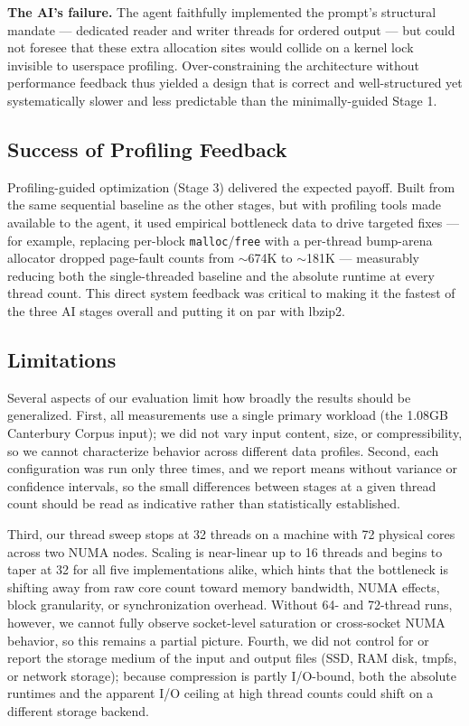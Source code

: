 \documentclass[conference]{IEEEtran}
\begin{document}
\textbf{The AI's failure.} The agent faithfully implemented the prompt's structural mandate --- dedicated reader and writer threads for ordered output --- but could not foresee that these extra allocation sites would collide on a kernel lock invisible to userspace profiling. Over-constraining the architecture without performance feedback thus yielded a design that is correct and well-structured yet systematically slower and less predictable than the minimally-guided Stage 1.

\subsection{Success of Profiling Feedback}
Profiling-guided optimization (Stage 3) delivered the expected payoff. Built from the same sequential baseline as the other stages, but with profiling tools made available to the agent, it used empirical bottleneck data to drive targeted fixes --- for example, replacing per-block \texttt{malloc}/\texttt{free} with a per-thread bump-arena allocator dropped page-fault counts from $\sim$674K to $\sim$181K --- measurably reducing both the single-threaded baseline and the absolute runtime at every thread count. This direct system feedback was critical to making it the fastest of the three AI stages overall and putting it on par with lbzip2.

\subsection{Limitations}
Several aspects of our evaluation limit how broadly the results should be generalized. First, all measurements use a single primary workload (the 1.08GB Canterbury Corpus input); we did not vary input content, size, or compressibility, so we cannot characterize behavior across different data profiles. Second, each configuration was run only three times, and we report means without variance or confidence intervals, so the small differences between stages at a given thread count should be read as indicative rather than statistically established.

Third, our thread sweep stops at 32 threads on a machine with 72 physical cores across two NUMA nodes. Scaling is near-linear up to 16 threads and begins to taper at 32 for all five implementations alike, which hints that the bottleneck is shifting away from raw core count toward memory bandwidth, NUMA effects, block granularity, or synchronization overhead. Without 64- and 72-thread runs, however, we cannot fully observe socket-level saturation or cross-socket NUMA behavior, so this remains a partial picture. Fourth, we did not control for or report the storage medium of the input and output files (SSD, RAM disk, tmpfs, or network storage); because compression is partly I/O-bound, both the absolute runtimes and the apparent I/O ceiling at high thread counts could shift on a different storage backend.
\end{document}

